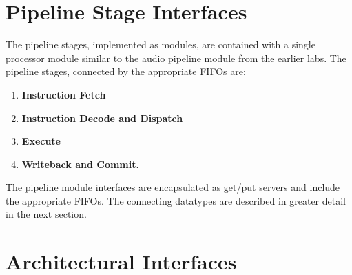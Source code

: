 \documentclass[12pt]{article}
\begin{document}
\section{Pipeline Stage Interfaces}
The pipeline stages, implemented as modules, are contained with a single processor module similar to the audio 
pipeline module from the earlier labs. The pipeline stages, connected by the appropriate FIFOs are:
\begin{enumerate}
    \item \textbf{Instruction Fetch}
    \item \textbf{Instruction Decode and Dispatch}
    \item \textbf{Execute}
    \item \textbf{Writeback and Commit}.
\end{enumerate}
The pipeline module interfaces are encapsulated as get/put servers and include the appropriate FIFOs. The connecting 
datatypes are described in greater detail in the next section.

\section{Architectural Interfaces}
\end{document}
